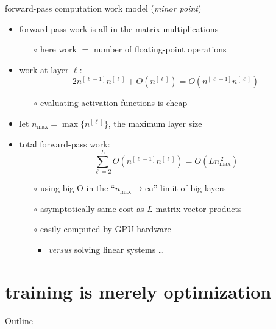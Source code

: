 \documentclass[xcolor={svgnames},
               hyperref={colorlinks,citecolor=DeepPink4,linkcolor=FireBrick,urlcolor=Maroon}]
               {beamer}
\begin{document}
\begin{frame}{forward-pass computation work model (\emph{minor point})}

\begin{itemize}
\item forward-pass work is all in the matrix multiplications
    \begin{itemize}
    \item[$\circ$] here work $=$ number of floating-point operations
    \end{itemize}
\item work at layer $\ell$:
    $$2 n^{[\ell-1]} n^{[\ell]} + O(n^{[\ell]}) = O(n^{[\ell-1]} n^{[\ell]})$$

    \begin{itemize}
    \item[$\circ$] evaluating activation functions is cheap
    \end{itemize}
\item let $n_{\text{max}} =\max\{n^{[\ell]}\}$, the maximum layer size
\item total forward-pass work:
    $$\sum_{\ell=2}^L O(n^{[\ell-1]} n^{[\ell]}) = O(L n_{\text{max}}^{\,2})$$

    \begin{itemize}
    \item[$\circ$] using big-O in the ``$n_{\text{max}} \to \infty$'' limit of big layers
    \item[$\circ$] asymptotically same cost as $L$ matrix-vector products
    \item[$\circ$] easily computed by GPU hardware
        \begin{itemize}
        \item \emph{versus} solving linear systems \dots
        \end{itemize}
    \end{itemize}
\end{itemize}
\end{frame}


\section{training is merely optimization}

\begin{frame}{Outline}
\end{frame}
\end{document}
